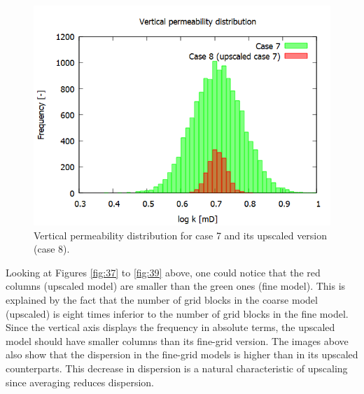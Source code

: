 \begin{figure}[H]
	\centering
	\includegraphics[width=0.82\linewidth]{Images/44}
	\caption{Vertical permeability distribution for case 7 and its upscaled version (case 8).}
	\label{fig:44}
\end{figure}
Looking at Figures \ref{fig:37} to \ref{fig:39} above, one could notice that the red columns (upscaled model) are smaller than the green ones (fine model). This is explained by the fact that the number of grid blocks in the coarse model (upscaled) is eight times inferior to the number of grid blocks in the fine model. Since the vertical axis displays the frequency in absolute terms, the upscaled model should have smaller columns than its fine-grid version. The images above also show that the dispersion in the fine-grid models is higher than in its upscaled counterparts. This decrease in dispersion is a natural characteristic of upscaling since averaging reduces dispersion.